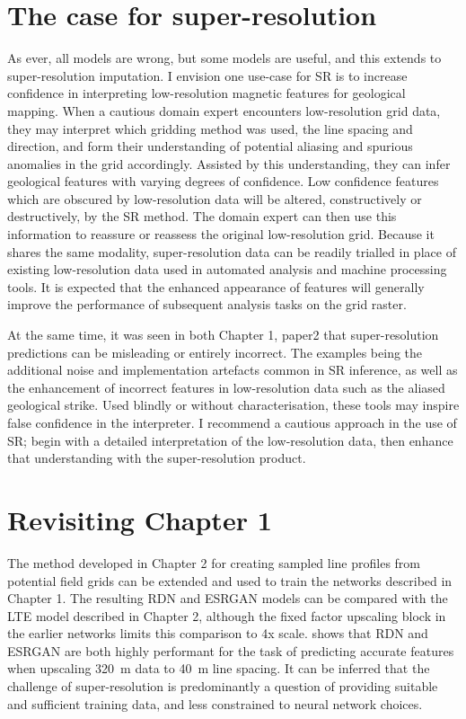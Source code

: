 \documentclass[manuscript.tex]{subfiles}
\begin{document}
\section{The case for super-resolution}
As ever, all models are wrong, but some models are useful, and this extends to super-resolution imputation.
I envision one use-case for SR is to increase confidence in interpreting low-resolution magnetic features for geological mapping. 
When a cautious domain expert encounters low-resolution grid data, they may interpret which gridding method was used, the line spacing and direction, and form their understanding of potential aliasing and spurious anomalies in the grid accordingly.
Assisted by this understanding, they can infer geological features with varying degrees of confidence.
Low confidence features which are obscured by low-resolution data will be altered, constructively or destructively, by the SR method.
The domain expert can then use this information to reassure or reassess the original low-resolution grid.
Because it shares the same modality, super-resolution data can be readily trialled in place of existing low-resolution data used in automated analysis and machine processing tools.
It is expected that the enhanced appearance of features will generally improve the performance of subsequent analysis tasks on the grid raster.

At the same time, it was seen in both Chapter 1, paper2 that super-resolution predictions can be misleading or entirely incorrect.
The examples being the additional noise and implementation artefacts common in SR inference, as well as the enhancement of incorrect features in low-resolution data such as the aliased geological strike.
Used blindly or without characterisation, these tools may inspire false confidence in the interpreter.
I recommend a cautious approach in the use of SR\@; begin with a detailed interpretation of the low-resolution data, then enhance that understanding with the super-resolution product.

\section{Revisiting Chapter 1}
The method developed in Chapter 2 for creating sampled line profiles from potential field grids can be extended and used to train the networks described in Chapter 1.
The resulting RDN and ESRGAN models can be compared with the LTE model described in Chapter 2, although the fixed factor upscaling block in the earlier networks limits this comparison to 4x scale.
 shows that RDN and ESRGAN are both highly performant for the task of predicting accurate features when upscaling \qty{320}{\m} data to \qty{40}{\m} line spacing.
It can be inferred that the challenge of super-resolution is predominantly a question of providing suitable and sufficient training data, and less constrained to neural network choices.
\end{document}
